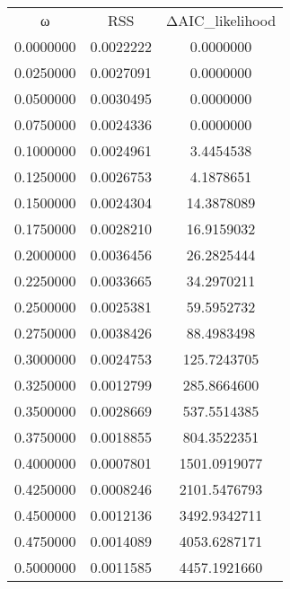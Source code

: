 \begin{tabular}{ccc}
ω & RSS & ΔAIC_likelihood\\
0.0000000 & 0.0022222 & 0.0000000\\
0.0250000 & 0.0027091 & 0.0000000\\
0.0500000 & 0.0030495 & 0.0000000\\
0.0750000 & 0.0024336 & 0.0000000\\
0.1000000 & 0.0024961 & 3.4454538\\
0.1250000 & 0.0026753 & 4.1878651\\
0.1500000 & 0.0024304 & 14.3878089\\
0.1750000 & 0.0028210 & 16.9159032\\
0.2000000 & 0.0036456 & 26.2825444\\
0.2250000 & 0.0033665 & 34.2970211\\
0.2500000 & 0.0025381 & 59.5952732\\
0.2750000 & 0.0038426 & 88.4983498\\
0.3000000 & 0.0024753 & 125.7243705\\
0.3250000 & 0.0012799 & 285.8664600\\
0.3500000 & 0.0028669 & 537.5514385\\
0.3750000 & 0.0018855 & 804.3522351\\
0.4000000 & 0.0007801 & 1501.0919077\\
0.4250000 & 0.0008246 & 2101.5476793\\
0.4500000 & 0.0012136 & 3492.9342711\\
0.4750000 & 0.0014089 & 4053.6287171\\
0.5000000 & 0.0011585 & 4457.1921660\\
\end{tabular}
